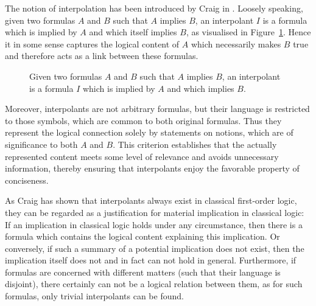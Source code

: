 

The notion of interpolation has been introduced by Craig in \cite{Craig57linear}.
Loosely speaking, given two formulas $A$ and $B$ such that $A$ implies $B$, an interpolant $I$ is a formula which is implied by $A$ and which itself implies $B$, as visualised in Figure~\ref{fig:interpol}.
Hence it in some sense captures the logical content of $A$ which necessarily makes $B$ true and therefore acts as a link between these formulas.

\begin{figure}[htbp]
	\centering
	\label{fig:interpol}
	\caption{Given two formulas $A$ and $B$ such that $A$ implies $B$, an interpolant is a formula $I$ which is implied by $A$ and which implies $B$.}
\end{figure}
Moreover, interpolants are not arbitrary formulas, but their language is restricted to those symbols, which are common to both original formulas.
Thus they represent the logical connection solely by statements on notions, which are of significance to both $A$ and $B$.
This criterion establishes that the actually represented content meets some level of relevance and avoids unnecessary information, thereby ensuring that interpolants enjoy the favorable property of conciseness.

As Craig has shown that interpolants always exist in classical first-order logic, they can be regarded as a justification for material implication in classical logic:
If an implication in classical logic holds under any circumstance, then there is a formula which contains the logical content explaining this implication.
Or conversely, if such a summary of a potential implication does not exist, then the implication itself does not and in fact can not hold in general.
Furthermore, if formulas are concerned with different matters (such that their language is disjoint), there certainly can not be a logical relation between them, as for such formulas, only trivial interpolants can be found.

